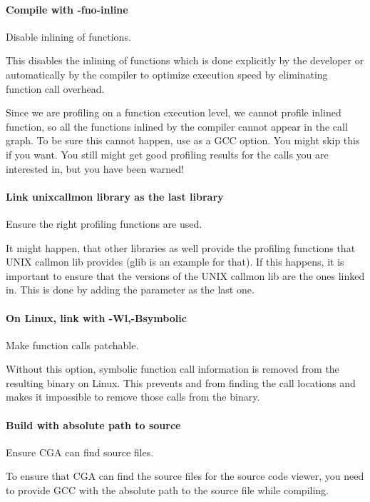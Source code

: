 \paragraph{Compile with -fno-inline} Disable inlining of functions.

This disables the inlining of functions which is done explicitly by the developer or automatically by the compiler to optimize execution speed by eliminating function call overhead.

Since we are profiling on a function execution level, we cannot profile inlined function, so all the functions inlined by the compiler cannot appear in the call graph. To be sure this cannot happen, use  as a GCC option. You might skip this if you want. You still might get good profiling results for the calls you are interested in, but you have been warned!

\paragraph{Link unixcallmon library as the last library} Ensure the right profiling functions are used.

It might happen, that other libraries as well provide the profiling functions that UNIX callmon lib provides (glib is an example for that). If this happens, it is important to ensure that the versions of the UNIX callmon lib are the ones linked in. This is done by adding the  parameter as the last one.

\paragraph{On Linux, link with -Wl,-Bsymbolic} Make function calls patchable.


Without this option, symbolic function call information is removed from the resulting binary on Linux. This prevents  and  from finding the call locations and makes it impossible to remove those calls from the binary. 

\paragraph{Build with absolute path to source} Ensure CGA can find source files.

To ensure that CGA can find the source files for the source code viewer, you need to provide GCC with the absolute path to the source file while compiling.

